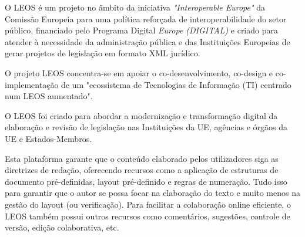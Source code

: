 O LEOS é um projeto no âmbito da iniciativa \emph{"Interoperable Europe"} da Comissão Europeia para uma política reforçada de 
interoperabilidade do setor público, financiado pelo Programa Digital \emph{Europe (DIGITAL)} e criado para atender à 
necessidade da administração pública e das Instituições Europeias de gerar projetos de legislação em formato XML jurídico.

O projeto LEOS concentra-se em apoiar o co-desenvolvimento, co-design e co-implementação de um "ecossistema de Tecnologias de 
Informação (TI) centrado num LEOS aumentado".

O LEOS foi criado para abordar a modernização e transformação digital da elaboração e revisão de legislação nas 
Instituições da UE, agências e órgãos da UE e Estados-Membros.

Esta plataforma garante que o conteúdo elaborado pelos utilizadores siga as diretrizes de redação, oferecendo recursos como a
aplicação de estruturas de documento pré-definidas, layout pré-definido e regras de numeração. 
Tudo isso para garantir que o autor se possa focar na elaboração do texto e muito menos na gestão do layout (ou verificação). 
Para facilitar a colaboração online eficiente, o LEOS também possui outros recursos como comentários, sugestões, 
controle de versão, edição colaborativa, etc.

